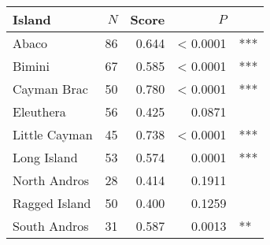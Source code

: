 
\begin{tabular}{lrrrl}
\toprule
Island & $N$ & Score & $P$ & \\
\midrule
Abaco & 86 & 0.644 & < 0.0001 & ***\\
Bimini & 67 & 0.585 & < 0.0001 & ***\\
Cayman Brac & 50 & 0.780 & < 0.0001 & ***\\
Eleuthera & 56 & 0.425 & 0.0871 & \\
Little Cayman & 45 & 0.738 & < 0.0001 & ***\\
Long Island & 53 & 0.574 & 0.0001 & ***\\
North Andros & 28 & 0.414 & 0.1911 & \\
Ragged Island & 50 & 0.400 & 0.1259 & \\
South Andros & 31 & 0.587 & 0.0013 & **\\
\bottomrule
\end{tabular}